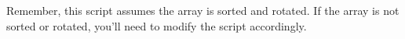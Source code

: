 \documentclass[preview]{standalone}
\begin{document}
Remember, this script assumes the array is sorted and rotated. If the array is not sorted or rotated, you'll need to modify the script accordingly.\\
\end{document}
